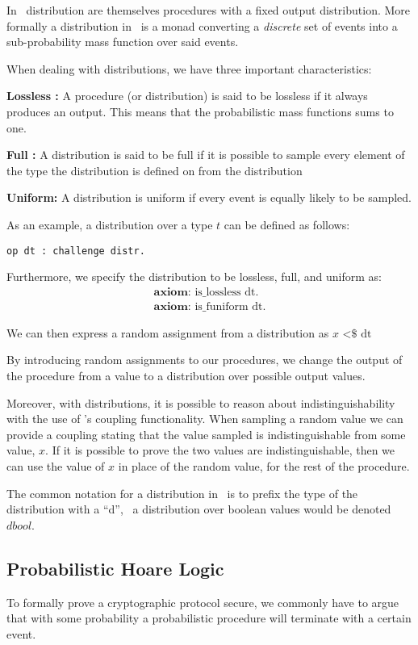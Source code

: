 In \easycrypt\ distribution are themselves procedures with a fixed output
distribution. More formally a distribution in \easycrypt\ is a monad converting a
\textit{discrete} set of events into a sub-probability mass function over said events.

When dealing with distributions, we have three important characteristics:

\noindent \textbf{Lossless :} A procedure (or distribution) is said to be
lossless if it always produces an output. This means that the
probabilistic mass functions sums to one.

\noindent \textbf{Full :} A distribution is said to be full if it is
possible to sample every element of the type the distribution is defined on from
the distribution

\noindent \textbf{Uniform: } A distribution is uniform if every event is equally
likely to be sampled.

As an example, a distribution over a type $t$ can be defined as follows:
\begin{lstlisting}[frame=none]
op dt : challenge distr.
\end{lstlisting}
Furthermore, we specify the distribution to be lossless, full, and uniform as:
\begin{gather*}
  \textbf{axiom: } \text{is\_lossless dt}. \\
  \textbf{axiom: } \text{is\_funiform dt}.
\end{gather*}

We can then express a random assignment from a distribution as $x \text{ <\$} \text{ dt}$


By introducing random assignments to our procedures, we change
the output of the procedure from a value to a distribution over possible output values.

Moreover, with distributions, it is possible to reason about indistinguishability
with the use of \easycrypt's coupling functionality. When sampling a random
value we can provide a coupling stating that the value sampled is
indistinguishable from some value, $x$. If it is possible to prove the two
values are indistinguishable, then we can use the value of $x$ in place of the
random value, for the rest of the procedure.


The common notation for a distribution in \easycrypt\ is to prefix the type of
the distribution with a ``d'', \eg\ a distribution over boolean values would be
denoted $dbool$.

\subsection{Probabilistic Hoare Logic}
\label{sec:pHL}
To formally prove a cryptographic protocol secure, we commonly have to argue
that with some probability a probabilistic procedure will terminate with a certain event.

